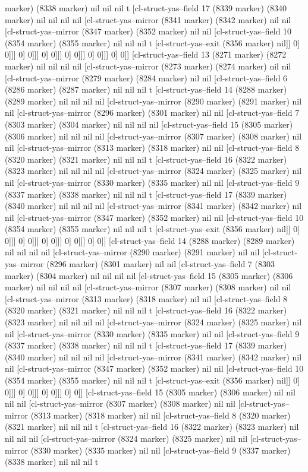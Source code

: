 {{marker) (8338 marker) nil nil nil t [cl-struct-yas--field 17 (8339 marker) (8340 marker) nil nil nil nil [cl-struct-yas--mirror (8341 marker) (8342 marker) nil nil [cl-struct-yas--mirror (8347 marker) (8352 marker) nil nil [cl-struct-yas--field 10 (8354 marker) (8355 marker) nil nil nil t [cl-struct-yas--exit (8356 marker) nil]] 0] 0]]] 0] 0]]] 0] 0]]] 0] 0]]] 0] 0]]] 0] 0]] [cl-struct-yas--field 13 (8271 marker) (8272 marker) nil nil nil nil [cl-struct-yas--mirror (8273 marker) (8274 marker) nil nil [cl-struct-yas--mirror (8279 marker) (8284 marker) nil nil [cl-struct-yas--field 6 (8286 marker) (8287 marker) nil nil nil t [cl-struct-yas--field 14 (8288 marker) (8289 marker) nil nil nil nil [cl-struct-yas--mirror (8290 marker) (8291 marker) nil nil [cl-struct-yas--mirror (8296 marker) (8301 marker) nil nil [cl-struct-yas--field 7 (8303 marker) (8304 marker) nil nil nil nil [cl-struct-yas--field 15 (8305 marker) (8306 marker) nil nil nil nil [cl-struct-yas--mirror (8307 marker) (8308 marker) nil nil [cl-struct-yas--mirror (8313 marker) (8318 marker) nil nil [cl-struct-yas--field 8 (8320 marker) (8321 marker) nil nil nil t [cl-struct-yas--field 16 (8322 marker) (8323 marker) nil nil nil nil [cl-struct-yas--mirror (8324 marker) (8325 marker) nil nil [cl-struct-yas--mirror (8330 marker) (8335 marker) nil nil [cl-struct-yas--field 9 (8337 marker) (8338 marker) nil nil nil t [cl-struct-yas--field 17 (8339 marker) (8340 marker) nil nil nil nil [cl-struct-yas--mirror (8341 marker) (8342 marker) nil nil [cl-struct-yas--mirror (8347 marker) (8352 marker) nil nil [cl-struct-yas--field 10 (8354 marker) (8355 marker) nil nil nil t [cl-struct-yas--exit (8356 marker) nil]] 0] 0]]] 0] 0]]] 0] 0]]] 0] 0]]] 0] 0]] [cl-struct-yas--field 14 (8288 marker) (8289 marker) nil nil nil nil [cl-struct-yas--mirror (8290 marker) (8291 marker) nil nil [cl-struct-yas--mirror (8296 marker) (8301 marker) nil nil [cl-struct-yas--field 7 (8303 marker) (8304 marker) nil nil nil nil [cl-struct-yas--field 15 (8305 marker) (8306 marker) nil nil nil nil [cl-struct-yas--mirror (8307 marker) (8308 marker) nil nil [cl-struct-yas--mirror (8313 marker) (8318 marker) nil nil [cl-struct-yas--field 8 (8320 marker) (8321 marker) nil nil nil t [cl-struct-yas--field 16 (8322 marker) (8323 marker) nil nil nil nil [cl-struct-yas--mirror (8324 marker) (8325 marker) nil nil [cl-struct-yas--mirror (8330 marker) (8335 marker) nil nil [cl-struct-yas--field 9 (8337 marker) (8338 marker) nil nil nil t [cl-struct-yas--field 17 (8339 marker) (8340 marker) nil nil nil nil [cl-struct-yas--mirror (8341 marker) (8342 marker) nil nil [cl-struct-yas--mirror (8347 marker) (8352 marker) nil nil [cl-struct-yas--field 10 (8354 marker) (8355 marker) nil nil nil t [cl-struct-yas--exit (8356 marker) nil]] 0] 0]]] 0] 0]]] 0] 0]]] 0] 0]] [cl-struct-yas--field 15 (8305 marker) (8306 marker) nil nil nil nil [cl-struct-yas--mirror (8307 marker) (8308 marker) nil nil [cl-struct-yas--mirror (8313 marker) (8318 marker) nil nil [cl-struct-yas--field 8 (8320 marker) (8321 marker) nil nil nil t [cl-struct-yas--field 16 (8322 marker) (8323 marker) nil nil nil nil [cl-struct-yas--mirror (8324 marker) (8325 marker) nil nil [cl-struct-yas--mirror (8330 marker) (8335 marker) nil nil [cl-struct-yas--field 9 (8337 marker) (8338 marker) nil nil nil t }}
